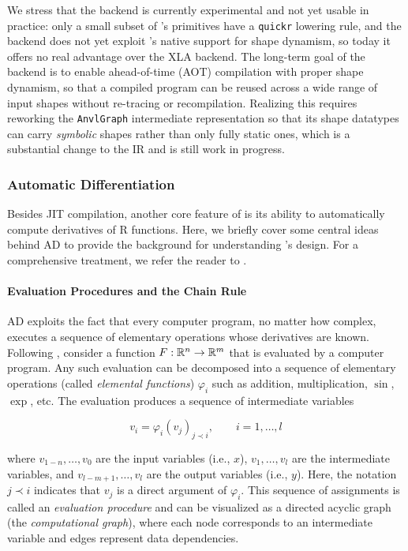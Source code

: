We stress that the  backend is currently experimental and not yet usable in practice: only a small subset of 's primitives have a \texttt{quickr} lowering rule, and the backend does not yet exploit 's native support for shape dynamism, so today it offers no real advantage over the XLA backend.
The long-term goal of the  backend is to enable ahead-of-time (AOT) compilation with proper shape dynamism, so that a compiled program can be reused across a wide range of input shapes without re-tracing or recompilation.
Realizing this requires reworking the \texttt{AnvlGraph} intermediate representation so that its shape datatypes can carry \emph{symbolic} shapes rather than only fully static ones, which is a substantial change to the IR and is still work in progress.

\subsubsection{Automatic Differentiation}\label{automatic-differentiation}

Besides JIT compilation, another core feature of  is its ability to automatically compute derivatives of R functions.
Here, we briefly cover some central ideas behind AD to provide the background for understanding 's design.
For a comprehensive treatment, we refer the reader to \citet{ref-griewank2008evaluating}.

\paragraph{Evaluation Procedures and the Chain Rule}\label{evaluation-procedures-and-the-chain-rule}

AD exploits the fact that every computer program, no matter how complex, executes a sequence of elementary operations whose derivatives are known.
Following \citet{ref-griewank2008evaluating}, consider a function \(F : \mathbb{R}^n \to \mathbb{R}^m\) that is evaluated by a computer program.
Any such evaluation can be decomposed into a sequence of elementary operations (called \emph{elemental functions}) \(\varphi_i\) such as addition, multiplication, \(\sin\), \(\exp\), etc.
The evaluation produces a sequence of intermediate variables

\[v_i = \varphi_i(v_j)_{j \prec i}, \qquad i = 1, \ldots, l\]

where \(v_{1-n}, \ldots, v_0\) are the input variables (i.e., \(x\)), \(v_1, \ldots, v_l\) are the intermediate variables, and \(v_{l-m+1}, \ldots, v_l\) are the output variables (i.e., \(y\)).
Here, the notation \(j \prec i\) indicates that \(v_j\) is a direct argument of \(\varphi_i\).
This sequence of assignments is called an \emph{evaluation procedure} and can be visualized as a directed acyclic graph (the \emph{computational graph}), where each node corresponds to an intermediate variable and edges represent data dependencies.

